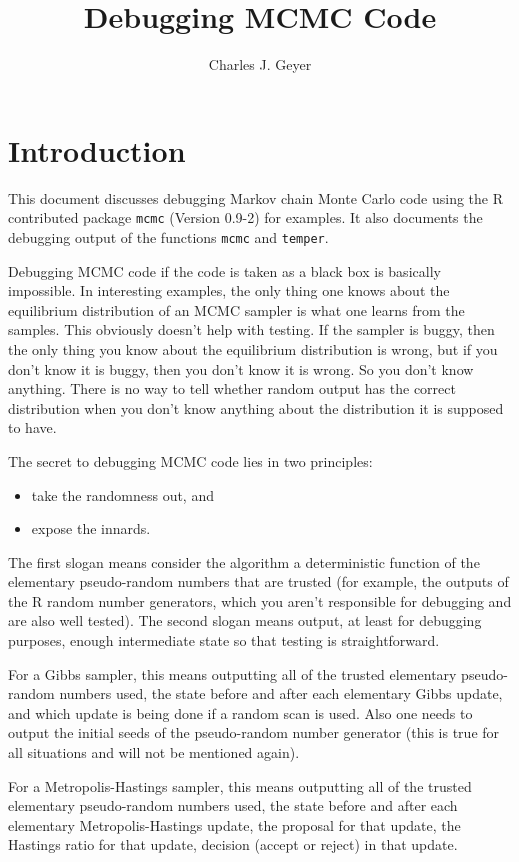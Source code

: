 \documentclass{article}
\begin{document}
\title{Debugging MCMC Code}
\author{Charles J. Geyer}
\maketitle

\section{Introduction}

This document discusses debugging Markov chain Monte Carlo code
using the R contributed package \texttt{mcmc} (Version 0.9-2)
for examples.  It also documents the debugging output of the functions
\texttt{mcmc} and \texttt{temper}.

Debugging MCMC code if the code is taken as a black box is basically
impossible.  In interesting examples, the only thing one knows about
the equilibrium distribution of an MCMC sampler is what one learns
from the samples.  This obviously doesn't help with testing.  If the
sampler is buggy, then the only thing you know about the equilibrium
distribution is wrong, but if you don't know it is buggy, then you don't
know it is wrong.  So you don't know anything.  There is no way to tell
whether random output has the correct distribution when you don't know
anything about the distribution it is supposed to have.

The secret to debugging MCMC code lies in two principles:
\begin{itemize}
\item take the randomness out, and
\item expose the innards.
\end{itemize}
The first slogan means consider the algorithm a deterministic function
of the elementary pseudo-random numbers that are trusted (for example,
the outputs of the R random number generators, which you aren't responsible
for debugging and are also well tested).
The second slogan means output, at least for debugging purposes, enough
intermediate state so that testing is straightforward.

For a Gibbs sampler, this means outputting all of the trusted elementary
pseudo-random numbers used, the state before and after each elementary
Gibbs update, and which update is being done if a random scan is used.
Also one needs to output the initial seeds of the pseudo-random number
generator (this is true for all situations and will not be mentioned again).

For a Metropolis-Hastings sampler, this means outputting all of the trusted
elementary
pseudo-random numbers used, the state before and after each elementary
Metropolis-Hastings update, the proposal for that update, the Hastings ratio
for that update, decision (accept or reject) in that update.
\end{document}
